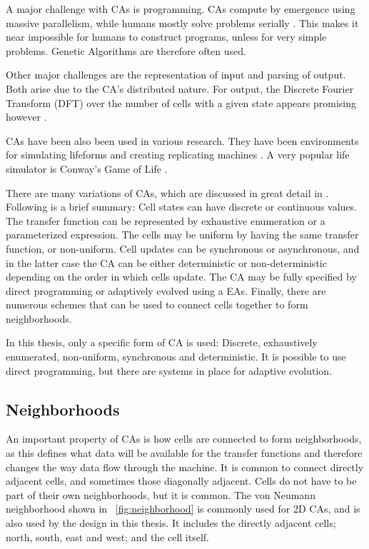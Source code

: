 A major challenge with CAs is programming.
CAs compute by emergence using massive parallelism, while humans mostly solve problems serially \cite{newell1972problemsolving}.
This makes it near impossible for humans to construct programs, unless for very simple problems.
Genetic Algorithms are therefore often used.

Other major challenges are the representation of input and parsing of output.
Both arise due to the CA's distributed nature.
For output, the Discrete Fourier Transform (DFT) over the number of cells with a given state appears promising however \cite{berg2013ca}.

CAs have been also been used in various research.
They have been environments for simulating lifeforms and creating replicating machines \cite{neumann1966selfreplication}.
A very popular life simulator is Conway's Game of Life \cite{gardner1970life}.

There are many variations of CAs, which are discussed in great detail in \cite{sipper1999emergence}.
Following is a brief summary:
Cell states can have discrete or continuous values.
The transfer function can be represented by exhaustive enumeration or a parameterized expression.
The cells may be uniform by having the same transfer function, or non-uniform.
Cell updates can be synchronous or asynchronous, and in the latter case the CA can be either deterministic or non-deterministic depending on the order in which cells update.
The CA may be fully specified by direct programming or adaptively evolved using a EAs.
Finally, there are numerous schemes that can be used to connect cells together to form neighborhoods.

In this thesis, only a specific form of CA is used:
Discrete, exhaustively enumerated, non-uniform, synchronous and deterministic.
It is possible to use direct programming, but there are systems in place for adaptive evolution.

\subsection{Neighborhoods}

An important property of CAs is how cells are connected to form neighborhoods, as this defines what data will be available for the transfer functions and therefore changes the way data flow through the machine.
It is common to connect directly adjacent cells, and sometimes those diagonally adjacent.
Cells do not have to be part of their own neighborhoods, but it is common.
The von Neumann neighborhood shown in \figurename~\ref{fig:neighborhood} is commonly used for 2D CAs, and is also used by the design in this thesis.
It includes the directly adjacent cells; north, south, east and west; and the cell itself.

